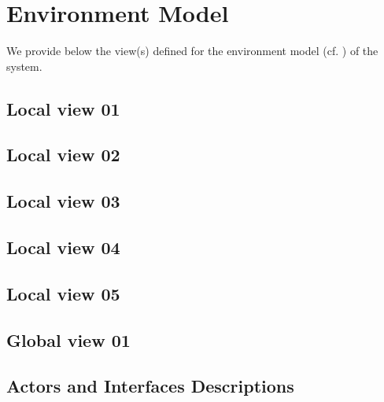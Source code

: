 \chapter{Environment Model}
\label{chap:lu.uni.lassy.excalibur.examples.icrash-EM}



We provide below the view(s) defined for the \msrmessir environment model (cf. \cite{messirbook}) of the system. 


\section{Local view 01}
\label{sec:lu.uni.lassy.excalibur.examples.icrash-EM-view-01-local}

\section{Local view 02}
\label{sec:lu.uni.lassy.excalibur.examples.icrash-EM-view-02-local}

\section{Local view 03}
\label{sec:lu.uni.lassy.excalibur.examples.icrash-EM-view-03-local}

\section{Local view 04}
\label{sec:lu.uni.lassy.excalibur.examples.icrash-EM-view-04-local}

\section{Local view 05}
\label{sec:lu.uni.lassy.excalibur.examples.icrash-EM-view-05-local}



\section{Global view 01}
\label{sec:lu.uni.lassy.excalibur.examples.icrash-EM-view-01-global}




\section{Actors and Interfaces Descriptions}
\label{sec:lu.uni.lassy.excalibur.examples.icrash-EM-Actors-Descriptions}


